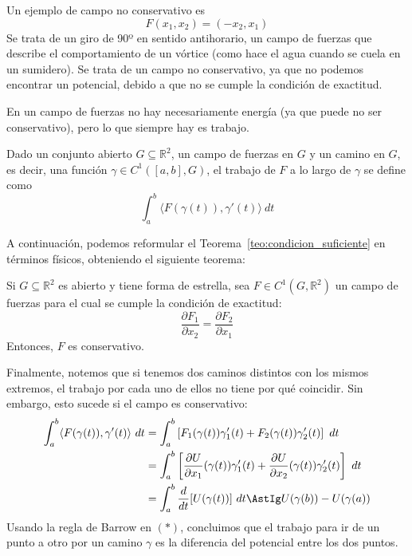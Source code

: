 \begin{ejemplo}
    Un ejemplo de campo no conservativo es
    \begin{equation*}
        F(x_1,x_2) = (-x_2, x_1)
    \end{equation*}
    Se trata de un giro de 90º en sentido antihorario, un campo de fuerzas que describe el comportamiento de un vórtice (como hace el agua cuando se cuela en un sumidero). Se trata de un campo no conservativo, ya que no podemos encontrar un potencial, debido a que no se cumple la condición de exactitud.
\end{ejemplo}

En un campo de fuerzas no hay necesariamente energía (ya que puede no ser conservativo), pero lo que siempre hay es trabajo.

\begin{definicion}[Trabajo]
    Dado un conjunto abierto $G\subseteq \mathbb{R}^2$, un campo de fuerzas en $G$ y un camino en $G$, es decir, una función $\gamma\in C^1([a,b], G)$, el trabajo de $F$ a lo largo de $\gamma$ se define como
    \begin{equation*}
        \int_{a}^{b} \langle F(\gamma(t)), \gamma'(t) \rangle~dt 
    \end{equation*}
\end{definicion}

A continuación, podemos reformular el Teorema~\ref{teo:condicion_suficiente} en términos físicos, obteniendo el siguiente teorema:

\begin{teo}
    Si $G\subseteq \mathbb{R}^2$ es abierto y tiene forma de estrella, sea $F\in C^1(G,\mathbb{R}^2)$ un campo de fuerzas para el cual se cumple la condición de exactitud:
    \begin{equation*}
        \dfrac{\partial F_1}{\partial x_2} = \dfrac{\partial F_2}{\partial x_1}
    \end{equation*}
    Entonces, $F$ es conservativo.
\end{teo}

Finalmente, notemos que si tenemos dos caminos distintos con los mismos extremos, el trabajo por cada uno de ellos no tiene por qué coincidir. Sin embargo, esto sucede si el campo es conservativo:
\begin{align*}
    \int_{a}^{b} \langle F(\gamma(t)), \gamma'(t) \rangle~dt  &= \int_{a}^{b} \left[F_1(\gamma(t))\gamma_1'(t) + F_2(\gamma(t))\gamma_2'(t)\right]~dt   \\
                                                              &= \int_{a}^{b} \left[\dfrac{\partial U}{\partial x_1}(\gamma(t))\gamma_1'(t) + \dfrac{\partial U}{\partial x_2}(\gamma(t))\gamma_2'(t)\right]~dt   \\
                                                              &= \int_{a}^{b} \dfrac{d}{dt}[U(\gamma(t))]~dt \AstIg U(\gamma(b)) - U(\gamma(a))
\end{align*}
Usando la regla de Barrow en $(\ast)$, concluimos que el trabajo para ir de un punto a otro por un camino $\gamma$ es la diferencia del potencial entre los dos puntos.\\

